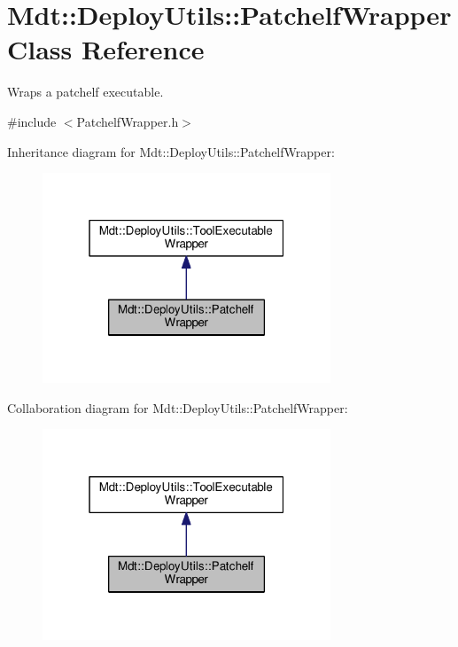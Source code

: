 \hypertarget{class_mdt_1_1_deploy_utils_1_1_patchelf_wrapper}{}\section{Mdt\+:\+:Deploy\+Utils\+:\+:Patchelf\+Wrapper Class Reference}
\label{class_mdt_1_1_deploy_utils_1_1_patchelf_wrapper}


Wraps a patchelf executable.  




{\ttfamily \#include $<$Patchelf\+Wrapper.\+h$>$}



Inheritance diagram for Mdt\+:\+:Deploy\+Utils\+:\+:Patchelf\+Wrapper\+:\nopagebreak
\begin{figure}[H]
\begin{center}
\leavevmode
\includegraphics[width=244pt]{class_mdt_1_1_deploy_utils_1_1_patchelf_wrapper__inherit__graph}
\end{center}
\end{figure}


Collaboration diagram for Mdt\+:\+:Deploy\+Utils\+:\+:Patchelf\+Wrapper\+:\nopagebreak
\begin{figure}[H]
\begin{center}
\leavevmode
\includegraphics[width=244pt]{class_mdt_1_1_deploy_utils_1_1_patchelf_wrapper__coll__graph}
\end{center}
\end{figure}
